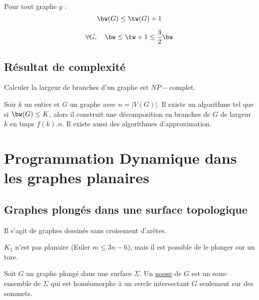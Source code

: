 \documentclass[a4paper, 11pt]{thesis}
\begin{document}
\begin{prop}
    Pour tout graphe $g$ : 
    \begin{displaymath}
        \bw(G) \leq \tw(G) + 1
    \end{displaymath}
\end{prop}

\begin{prop}
    \begin{displaymath}
        \forall G, \quad \bw \leq \tw + 1 \leq \frac{3}{2} \bw
    \end{displaymath}
\end{prop}

\subsection{Résultat de complexité}

\begin{thrm}
    Calculer la largeur de branches d'un graphe est $NP-$complet.
\end{thrm}

\begin{thrm}
    Soir $k$ un entier et $G$ un graphe avec $n = |V(G)|$. Il existe un algorithme tel que si
    $\bw(G) \leq K$, alors il construit une décomposition en branches de $G$ de largeur $k$ en tmps
    $f(k).n$. Il existe aussi des algorithmes d'approximation.
\end{thrm}

\section{Programmation Dynamique dans les graphes planaires}

\subsection{Graphes plongés dans une surface topologique}

Il s'agit de graphes dessinés sans croisement d'arêtes.

\begin{ex}
    $K_5$ n'est pas planaire (Euler $m \leq 3n - 6$), mais il est possible de le plonger sur un
    tore.
\end{ex}

\begin{df}
    Soit $G$ un graphe plongé dans une surface $\Sigma$. Un \underline{noose} de $G$ est un
    sous-ensemble de $\Sigma$ qui est homéomorphe à un cercle  intersectant $G$ seulement sur des
    sommets.
\end{df}
\end{document}
